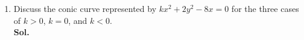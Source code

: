 \documentclass{report}
\newcommand{\sol}{\vspace{1em}\\\textbf{Sol.}}
\newcommand{\eos}{ \qquad \square}
\begin{document}
\begin{enumerate}
\begin{enumerate}
              \item $x^2-y^2-4x+2y-1=0$
                    \sol{}
                    \begin{align*}
                        x^2-4x-y^2+2y-1                 & = 0 \\
                        x^2-4x-y^2+2y                   & = 1 \\
                        (x^2-4x+4) - 4 - (y^2-2y+1) - 1 & = 1 \\
                        (x-2)^2 - (y-1)^2               & = 6 \\
                    \end{align*}
                    The equation is of the form
                    \begin{equation*}
                        (x-h)^2 - (y-k)^2 = a^2
                    \end{equation*}
                    Therefore, the curve is a \textbf{rectangular hyperbola} with $a^2=6$.

                    The eccentricity of any rectangular hyperbola $\sqrt{2}$. $\eos$
          \end{enumerate}

          \newpage

    \item Discuss the conic curve represented by $kx^2+2y^2-8x=0$ for the three cases of
          $k>0$, $k=0$, and $k<0$. \sol{}


\end{enumerate}
\end{document}
